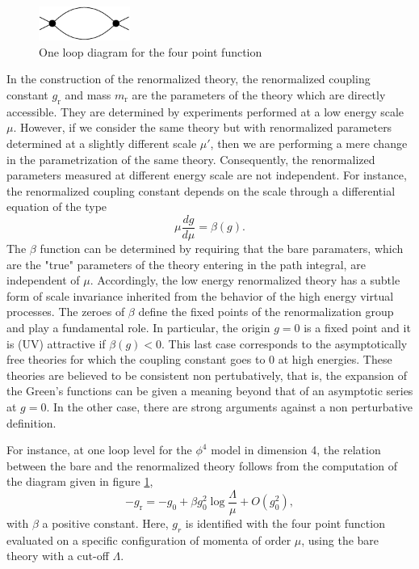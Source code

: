 \documentclass[10pt,here,feynmf]{article}
\begin{document}
\begin{figure}
\begin{center}
\includegraphics[width=3cm]{oneloop.pdf}
\caption{One loop diagram for the four point function}
\label{simpleoneloop}
\end{center}
\end{figure}

In the construction of the renormalized theory, the renormalized coupling constant $g_{\mathrm{r}}$ and mass $m_{\mathrm{r}}$ are the parameters of the theory which are directly accessible. They are determined by experiments performed at a low energy scale $\mu$. However, if we consider the same theory but with renormalized parameters determined at a slightly different scale $\mu'$, then we are performing a mere change in the parametrization of the same theory. Consequently, the renormalized parameters measured at different energy scale are not independent. For instance, the renormalized coupling  constant depends on the scale through a differential equation of the type
\begin{equation}
\mu\frac{dg}{d\mu}=\beta(g).
\end{equation}    
The $\beta$ function can be determined by requiring that the bare paramaters, which are the "true" parameters of the theory entering in the path integral, are independent of $\mu$.  Accordingly, the low energy renormalized theory has a subtle form of scale invariance inherited from the behavior of the high energy virtual processes. The zeroes of $\beta$ define the fixed points of the renormalization group  and play a fundamental role. In particular, the origin $g=0$ is a fixed point and it is (UV) attractive if $\beta(g)<0$. This last case corresponds to the asymptotically free theories for which the coupling constant goes to $0$ at high energies.  These theories are believed to be consistent non pertubatively, that is,  the expansion of the Green's functions can be given a meaning beyond that of an asymptotic series at $g=0$. In the other case, there are strong arguments against a non perturbative definition.




For instance, at one loop level for the $\phi^{4}$ model in dimension 4, the relation between the bare and the renormalized theory follows from the computation of the diagram given in figure \ref{simpleoneloop},
\begin{equation}
-g_{\mathrm{r}}=-g_{0}+\beta g_{0}^{2}\log\frac{\Lambda}{\mu}+O(g_{0}^{2}),\label{betaoneloop}
\end{equation}
with $\beta$ a positive constant. Here, $g_{r}$ is identified with the four point function evaluated on a specific configuration of momenta of order $\mu$, using the bare theory with a cut-off $\Lambda$. 
\end{document}
